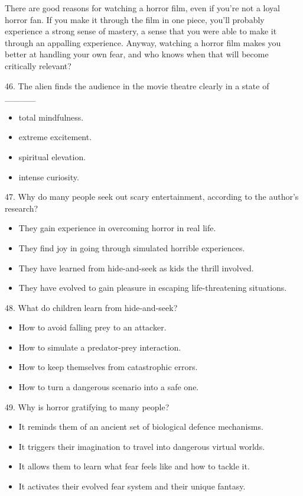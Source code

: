 \documentclass[UTF8,11pt]{ctexart}
\begin{document}
There are good reasons for watching a horror film, even if you’re not a loyal horror fan. If you make it through the film in one piece, you’ll probably experience a strong sense of mastery, a sense that you were able to make it through an appalling experience. Anyway, watching a horror film makes you better at handling your own fear, and who knows when that will become critically relevant?


46. The alien finds the audience in the movie theatre clearly in a state of \_\_\_\_\_


\begin{itemize}[leftmargin=2em,itemsep=.2em,topsep=.4em]\item[A.] total mindfulness.
\item[B.] extreme excitement.
\item[C.] spiritual elevation.
\item[D.] intense curiosity.
\end{itemize}

47. Why do many people seek out scary entertainment, according to the author’s research?


\begin{itemize}[leftmargin=2em,itemsep=.2em,topsep=.4em]\item[A.] They gain experience in overcoming horror in real life.
\item[B.] They find joy in going through simulated horrible experiences.
\item[C.] They have learned from hide-and-seek as kids the thrill involved.
\item[D.] They have evolved to gain pleasure in escaping life-threatening situations.
\end{itemize}

48. What do children learn from hide-and-seek?


\begin{itemize}[leftmargin=2em,itemsep=.2em,topsep=.4em]\item[A.] How to avoid falling prey to an attacker.
\item[B.] How to simulate a predator-prey interaction.
\item[C.] How to keep themselves from catastrophic errors.
\item[D.] How to turn a dangerous scenario into a safe one.
\end{itemize}

49. Why is horror gratifying to many people?


\begin{itemize}[leftmargin=2em,itemsep=.2em,topsep=.4em]\item[A.] It reminds them of an ancient set of biological defence mechanisms.
\item[B.] It triggers their imagination to travel into dangerous virtual worlds.
\item[C.] It allows them to learn what fear feels like and how to tackle it.
\item[D.] It activates their evolved fear system and their unique fantasy.
\end{itemize}
\end{document}
